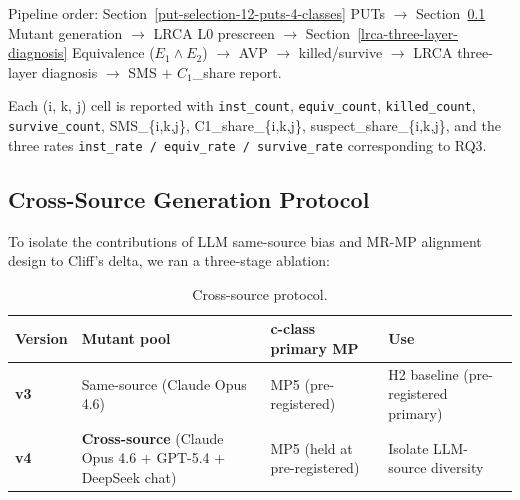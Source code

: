 \documentclass[12pt]{article}
\begin{document}
\noindent\textsf{\small Pipeline order: Section~\ref{put-selection-12-puts-4-classes} PUTs $\to$ Section~\ref{cross-source-v4-protocol-summary} Mutant generation $\to$ LRCA L0 prescreen $\to$ Section~\ref{lrca-three-layer-diagnosis} Equivalence ($E_1 \wedge E_2$) $\to$ AVP $\to$ killed/survive $\to$ LRCA three-layer diagnosis $\to$ SMS + $C_1$\_share report.}

Each (i, k, j) cell is reported with \texttt{inst\_count},
\texttt{equiv\_count}, \texttt{killed\_count}, \texttt{survive\_count},
SMS\_\{i,k,j\}, C1\_share\_\{i,k,j\}, suspect\_share\_\{i,k,j\}, and the
three rates \texttt{inst\_rate\ /\ equiv\_rate\ /\ survive\_rate}
corresponding to RQ3.

\subsection{Cross-Source Generation Protocol}\label{cross-source-v4-protocol-summary}

To isolate the contributions of LLM same-source bias and MR-MP alignment
design to Cliff's delta, we ran a three-stage ablation:

{\def\LTcaptype{table} %
\begin{longtable}[]{@{}
  >{\raggedright\arraybackslash}p{}
  >{\raggedright\arraybackslash}p{}
  >{\raggedright\arraybackslash}p{}
  >{\raggedright\arraybackslash}p{}@{}}
\caption{Cross-source protocol.}\label{tab:p2-06}\\
\toprule\noalign{}
\begin{minipage}[b]{\linewidth}\raggedright
Version
\end{minipage} & \begin{minipage}[b]{\linewidth}\raggedright
Mutant pool
\end{minipage} & \begin{minipage}[b]{\linewidth}\raggedright
c-class primary MP
\end{minipage} & \begin{minipage}[b]{\linewidth}\raggedright
Use
\end{minipage} \\
\midrule\noalign{}
\endhead
\bottomrule\noalign{}
\endlastfoot
\textbf{v3} & Same-source (Claude Opus 4.6) & MP5 (pre-registered) & H2
baseline (pre-registered primary) \\
\textbf{v4} & \textbf{Cross-source} (Claude Opus 4.6 + GPT-5.4 +
DeepSeek chat) & MP5 (held at pre-registered) & Isolate LLM-source
diversity \\
\end{longtable}
}
\end{document}
